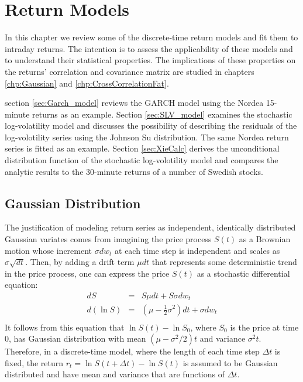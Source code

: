 \chapter{Return Models}\label{chp:PriceModels}
In this chapter we review some of the discrete-time return models and
fit them to intraday returns. The intention is to assess the
applicability of these models and to understand their statistical
properties. The implications of these properties on the returns'
correlation and covariance matrix are studied in chapters
\ref{chp:Gaussian} and \ref{chp:CrossCorrelationFat}.

section \ref{sec:Garch_model} reviews the GARCH model using the Nordea
15-minute returns as an example. Section \ref{sec:SLV_model} examines the
stochastic log-volatility model and discusses the possibility of
describing the residuals of the log-volotility series using the
Johnson Su distribution. The same Nordea return series is fitted as an
example. Section \ref{sec:XieCalc} derives the unconditional distribution
function of the stochastic log-volotility model and compares the
analytic results to the 30-minute returns of a number of Swedish
stocks.

\section{Gaussian Distribution}
The justification of modeling return series as independent,
identically distributed Gaussian variates comes from imagining the
price process $S(t)$ as a Brownian motion whose increment $\sigma
dw_t$ at each time step is independent and scales as $\sigma
\sqrt{dt}$. Then, by adding a drift term $\mu dt$ that represents some
deterministic trend in the price process, one can express the
price $S(t)$ as a stochastic differential equation:
\begin{eqnarray*}
  dS &=& S\mu dt + S\sigma dw_t \\
  d(\ln S) &=& (\mu - \frac{1}{2} \sigma^2)dt + \sigma dw_t \\
\end{eqnarray*}
It follows from this equation that $\ln S(t) - \ln S_0$, where $S_0$
is the price at time 0, has Gaussian distribution with mean $(\mu -
\sigma^2/2)t$ and variance $\sigma^2 t$. Therefore, in a discrete-time
model, where the length of each time step $\Delta t$ is fixed, the
return $r_t = \ln S(t + \Delta t) - \ln S(t)$ is assumed to be
Gaussian distributed and have mean and variance that are functions of
$\Delta t$.

